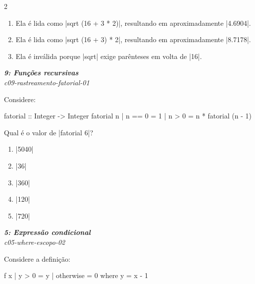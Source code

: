 \documentclass[a4paper,10pt,brazil]{article}
\begin{document}
\begin{multicols}{2}
\begin{enumerate}
  \item Ela é lida como \haskellinline|sqrt (16 + 3 * 2)|, resultando em aproximadamente \haskellinline|4.6904|.

  \item Ela é lida como \haskellinline|sqrt (16 + 3) * 2|, resultando em aproximadamente \haskellinline|8.7178|.

  \item Ela é inválida porque \haskellinline|sqrt| exige parênteses em volta de \haskellinline|16|.


\end{enumerate}

\begin{flushright}
  \footnotesize
  \textit{\textbf{9: Funções recursivas}}\\
  \textit{c09-rastreamento-fatorial-01}\\

\end{flushright}
Considere:
\begin{haskellcode}
fatorial :: Integer -> Integer
fatorial n
  | n == 0 = 1
  | n > 0  = n * fatorial (n - 1)
\end{haskellcode}
Qual é o valor de \haskellinline|fatorial 6|?

\begin{enumerate}
  \item \haskellinline|5040|

  \item \haskellinline|36|

  \item \haskellinline|360|

  \item \haskellinline|120|

  \item \haskellinline|720|


\end{enumerate}

\begin{flushright}
  \footnotesize
  \textit{\textbf{5: Expressão condicional}}\\
  \textit{c05-where-escopo-02}\\

\end{flushright}
Considere a definição:
\begin{haskellcode}
f x
  | y > 0     = y
  | otherwise = 0
  where y = x - 1


\end{haskellcode}
\end{multicols}
\end{document}
